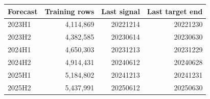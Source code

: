 \begin{tabular}{lrrr}
\toprule
Forecast & Training rows & Last signal & Last target end \\
\midrule
2023H1 & 4,114,869 & 20221214 & 20221230 \\
2023H2 & 4,382,585 & 20230614 & 20230630 \\
2024H1 & 4,650,303 & 20231213 & 20231229 \\
2024H2 & 4,914,431 & 20240612 & 20240628 \\
2025H1 & 5,184,802 & 20241213 & 20241231 \\
2025H2 & 5,437,991 & 20250612 & 20250630 \\
\bottomrule
\end{tabular}

